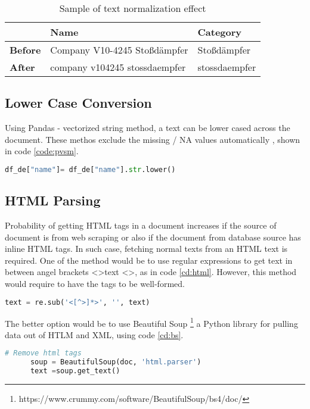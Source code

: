 \begin{table}[h]
      \caption{Sample of text normalization effect}
      \centering
      \label{table:TN}
\begin{tabular}{lll}
      \toprule 
                  &\textbf{Name} & \textbf{Category} \\ 
      \midrule
      \textbf{Before}& Company V10-4245 Stoßdämpfer & Stoßdämpfer \\
      \textbf{After}&company v104245 stossdaempfer & stossdaempfer \\
      
      \bottomrule
\end{tabular}
\end{table}

\subsection{Lower Case Conversion}

Using Pandas - vectorized string method, a text can be lower cased across the document. These methos exclude the missing  / NA values automatically \parencite{mckinney-proc-scipy-2010}, shown in code \ref{code:pvsm}.

\begin{lstlisting}[language=Python, caption={Pandas vectorized string method },label={code:pvsm}]
      df_de["name"]= df_de["name"].str.lower()
\end{lstlisting}

\subsection{HTML Parsing}

Probability of getting HTML tags in a document increases if the source of document is from web scraping or also if the document from database source has inline HTML tags. In such case, fetching normal texts from an HTML text is required. One of the method would be to use regular expressions to get text in between angel brackets \textless \textgreater text \textless \textgreater, as in code \ref{cd:html}. However, this method would require to have the tags to be well-formed.
\begin{lstlisting}[language=Python, caption={Regular expression to get text from html},label={cd:html}]
      text = re.sub('<[^>]*>', '', text)
\end{lstlisting}



The better option would be to use Beautiful Soup \footnote{https://www.crummy.com/software/BeautifulSoup/bs4/doc/} a Python library for pulling data out of HTLM and XML, using code \ref{cd:bs}.
\begin{lstlisting}[language=Python, caption={Beautiful soap API to get text from html},label={cd:bs}]
      # Remove html tags 
      soup = BeautifulSoup(doc, 'html.parser')
      text =soup.get_text()
\end{lstlisting}
\clearpage
